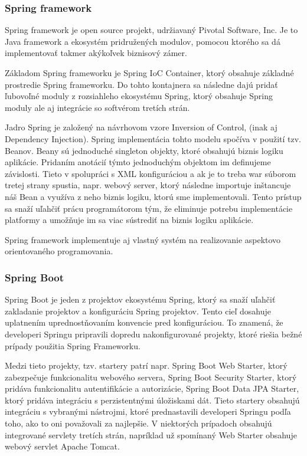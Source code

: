 \subsubsection{Spring framework}
Spring framework je open source projekt, udržiavaný  Pivotal Software, Inc. Je to Java framework a ekosystém pridružených modulov, pomocou ktorého sa dá implementovať takmer akýkoľvek biznisový zámer.  

Základom Spring frameworku je Spring IoC Container, ktorý obsahuje základné prostredie Spring frameworku. Do tohto kontajnera sa následne dajú pridať ľubovoľné moduly z rozsiahleho ekosystému Spring, ktorý obsahuje Spring moduly ale aj integrácie so softvérom tretích strán.

Jadro Spring je založený na návrhovom vzore Inversion of Control, (inak aj Dependency Injection). Spring implementácia tohto modelu spočíva v použití tzv. Beanov. Beany sú jednoduché singleton objekty, ktoré obsahujú biznis logiku aplikácie. Pridaním anotácií týmto jednoduchým objektom im definujeme závislosti. Tieto v spolupráci s XML konfiguráciou a ak je to treba war súborom tretej strany spustia, napr. webový server, ktorý následne importuje inštancuje náš Bean a využíva z neho biznis logiku, ktorú sme implementovali. 
Tento prístup sa snaží uľahčiť prácu programátorom tým, že eliminuje potrebu implementácie platformy a umožňuje im sa viac sústrediť na biznis logiku aplikácie.  

Spring framework implementuje aj vlastný systém na realizovanie aspektovo orientovaného programovania.

\subsubsection{Spring Boot}
Spring Boot je jeden z projektov ekosystému Spring, ktorý sa snaží uľahčiť zakladanie projektov a konfiguráciu Spring projektov. Tento cieľ dosahuje uplatnením uprednostňovaním konvencie pred konfiguráciou. To znamená, že developeri Springu pripravili dopredu nakonfigurované projekty, ktoré riešia bežné prípady použitia Spring Frameworku. 

Medzi tieto projekty, tzv. startery patrí napr. Spring Boot Web Starter, ktorý zabezpečuje funkcionalitu webového servera, Spring Boot Security Starter, ktorý pridáva funkcionalitu autentifikácie a autorizácie, Spring Boot Data JPA Starter, ktorý pridáva integráciu s perzistentnými úložiskami dát. Tieto startery obsahujú integráciu s vybranými nástrojmi, ktoré prednastavili developeri Springu podľa toho, ako to oni považovali za najlepšie. V niektorých prípadoch obsahujú integrované servlety tretích strán, napríklad už spomínaný Web Starter obsahuje webový servlet Apache Tomcat. 

